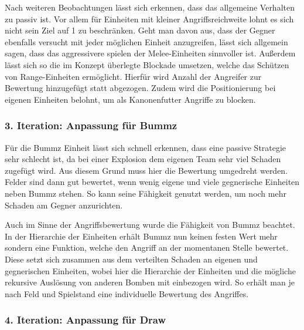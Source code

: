 Nach weiteren Beobachtungen lässt sich erkennen, dass das allgemeine Verhalten zu passiv ist. Vor allem für Einheiten mit kleiner Angriffsreichweite lohnt es sich nicht sein Ziel auf 1 zu beschränken. Geht man davon aus, dass der Gegner ebenfalls versucht mit jeder möglichen Einheit anzugreifen, lässt sich allgemein sagen, dass das aggressivere spielen der Melee-Einheiten sinnvoller ist. Außerdem lässt sich so die im Konzept überlegte Blockade umsetzen, welche das Schützen von Range-Einheiten ermöglicht. Hierfür wird Anzahl der Angreifer zur Bewertung hinzugefügt statt abgezogen. Zudem wird die Positionierung bei eigenen Einheiten belohnt, um als Kanonenfutter Angriffe zu blocken.

\subsubsection{3. Iteration: Anpassung für Bummz}

Für die Bummz Einheit lässt sich schnell erkennen, dass eine passive Strategie sehr schlecht ist, da bei einer Explosion dem eigenen Team sehr viel Schaden zugefügt wird. Aus diesem Grund muss hier die Bewertung umgedreht werden. Felder sind dann gut bewertet, wenn wenig eigene und viele gegnerische Einheiten neben Bummz stehen. So kann seine Fähigkeit genutzt werden, um noch mehr Schaden am Gegner anzurichten. 

Auch im Sinne der Angriffsbewertung wurde die Fähigkeit von Bummz beachtet. In der Hierarchie der Einheiten erhält Bummz nun keinen festen Wert mehr sondern eine Funktion, welche den Angriff an der momentanen Stelle bewertet. Diese setzt sich zusammen aus dem verteilten Schaden an eigenen und gegnerischen Einheiten, wobei hier die Hierarchie der Einheiten und die mögliche rekursive Auslösung von anderen Bomben mit einbezogen wird. So erhält man je nach Feld und Spielstand eine individuelle Bewertung des Angriffes.

\subsubsection{4. Iteration: Anpassung für Draw}

